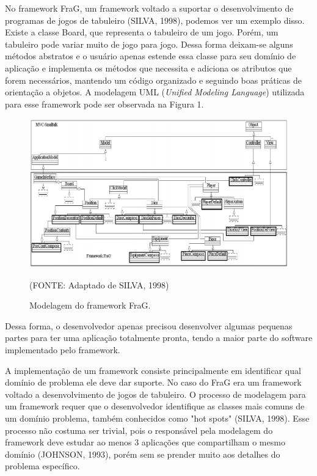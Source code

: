 \documentclass[
    12pt,       %
    openright,      %
    twoside,      %
    a4paper,      %
    english,      %
    french,       %
    spanish,      %
    brazil,       %
    ]{abntex2}
\begin{document}
          No framework FraG, um framework voltado a suportar o desenvolvimento de
          programas de jogos de tabuleiro (SILVA, 1998), podemos ver um exemplo disso.
          Existe a classe Board, que representa o tabuleiro de um jogo. Porém, um
          tabuleiro pode variar muito de jogo para jogo. Dessa
          forma deixam-se alguns métodos abstratos e o usuário apenas estende
          essa classe para seu domínio de aplicação e implementa os métodos que
          necessita e adiciona os atributos que forem necessários, mantendo
          um código organizado e seguindo boas práticas de orientação a objetos.
          A modelagem UML (\textit{Unified Modeling Language}) utilizada para esse
          framework pode ser observada na Figura 1.

          \begin{figure}[htbp]
              \begin{center}
                  \includegraphics[width=1.0\textwidth]{img/frag.png}
              \end{center}
              \caption{\label{fig:passaro}Modelagem do framework FraG.}
              \begin{center}(FONTE: Adaptado de SILVA, 1998)\end{center}
          \end{figure}

          Dessa forma, o desenvolvedor apenas precisou desenvolver algumas pequenas
          partes para ter uma aplicação totalmente pronta, tendo a maior parte
          do software implementado pelo framework.

          A implementação de um framework consiste principalmente em identificar
          qual domínio de problema ele deve dar suporte. No caso do FraG era um
          framework voltado a desenvolvimento de jogos de tabuleiro. O processo
          de modelagem para um framework requer que o desenvolvedor identifique
          as classes mais comuns de um domínio problema, também conhecidos como
          "hot spots" (SILVA, 1998). Esse processo não costuma ser trivial, pois o responsável
          pela modelagem do framework deve estudar ao menos 3 aplicações que compartilham o
          mesmo domínio (JOHNSON, 1993), porém sem se prender muito aos detalhes
          do problema específico.
\end{document}
